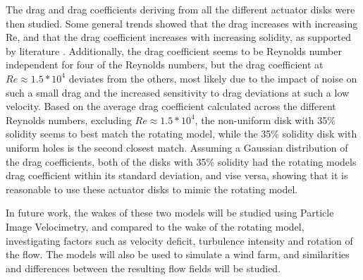 The drag and drag coefficients deriving from all the different actuator disks were then studied. Some general trends showed that the drag increases with increasing Re, and that the drag coefficient increases with increasing solidity, as supported by literature \cite{Lignarolo2016}. Additionally, the drag coefficient seems to be Reynolds number independent for four of the Reynolds numbers, but the drag coefficient at $Re \approx 1.5*10^4$ deviates from the others, most likely due to the impact of noise on such a small drag and the increased sensitivity to drag deviations at such a low velocity. Based on the average drag coefficient calculated across the different Reynolds numbers, excluding $Re \approx 1.5*10^4$, the non-uniform disk with 35\% solidity seems to best match the rotating model, while the 35\% solidity disk with uniform holes is the second closest match. Assuming a Gaussian distribution of the drag coefficients, both of the disks with 35\% solidity had the rotating models drag coefficient within its standard deviation, and vise versa, showing that it is reasonable to use these actuator disks to mimic the rotating model. 


In future work, the wakes of these two models will be studied using Particle Image Velocimetry, and compared to the wake of the rotating model, investigating factors such as velocity deficit, turbulence intensity and rotation of the flow. The models will also be used to simulate a wind farm, and similarities and differences between the resulting flow fields will be studied. 















